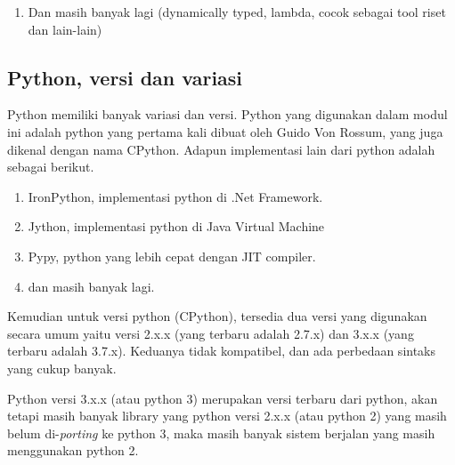 \begin{enumerate}
\begin{listprog}{Menulis teks ke file (Java)}
\begin{lstlisting}[language=Java]
		public class IOTest{
			public static void main(String[] args) {
		  	try {
		    	File f = new File("scratch");
		      PrintWriter ps = new PrintWriter(new OutputStreamWriter(new FileOutputStream(f)));
					for (int i = 0; i < 1000000; i++) {
						ps.print(String.valueOf(i));
					}
					ps.close();
				}
				catch(IOException ioe) {
					ioe.printStackTrace();
				}
			}
		}
		\end{lstlisting}
	\end{listprog}
	\begin{listprog}{Menulis teks ke File (Python)}
		\label{lst:tulisTeksPython}
		\begin{lstlisting}[language=Python]
		f=open('scratch','wb')
		for i in xrange(1000000):
			f.write(str(i))
		f.close()
		\end{lstlisting}
	\end{listprog}
	\item Dan masih banyak lagi (dynamically typed, lambda, cocok sebagai tool riset dan lain-lain)
\end{enumerate}

\subsection{Python, versi dan variasi}
Python memiliki banyak variasi dan versi. Python yang digunakan dalam modul ini adalah python yang pertama kali dibuat oleh Guido Von Rossum, yang juga dikenal dengan nama CPython. Adapun implementasi lain dari python adalah sebagai berikut.
\begin{enumerate}
	\item IronPython, implementasi python di .Net Framework.
	\item Jython, implementasi python di Java Virtual Machine
	\item Pypy, python yang lebih cepat dengan JIT compiler.
	\item dan masih banyak lagi.
\end{enumerate}

Kemudian untuk versi python (CPython), tersedia dua versi yang digunakan secara umum yaitu versi 2.x.x (yang terbaru adalah 2.7.x) dan 3.x.x (yang terbaru adalah 3.7.x). Keduanya tidak kompatibel, dan ada perbedaan sintaks yang cukup banyak. 

Python versi 3.x.x (atau python 3) merupakan versi terbaru dari python, akan tetapi masih banyak library yang python versi 2.x.x (atau python 2) yang masih belum di-\textit{porting} ke python 3, maka masih banyak sistem berjalan yang masih menggunakan python 2. 

